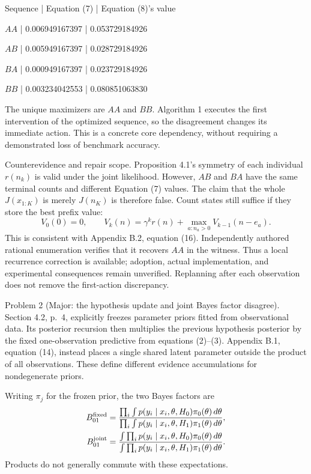 \documentclass[10pt]{article}
\begin{document}
Sequence | Equation (7) | Equation (8)’s value\par
\(AA\) | 0.006949167397 | 0.053729184926\par
\(AB\) | 0.005949167397 | 0.028729184926\par
\(BA\) | 0.000949167397 | 0.023729184926\par
\(BB\) | 0.003234042553 | 0.080851063830\par
The unique maximizers are \(AA\) and \(BB\). Algorithm 1 executes the first intervention of the optimized sequence, so the disagreement changes its immediate action. This is a concrete core dependency, without requiring a demonstrated loss of benchmark accuracy.\par
Counterevidence and repair scope. Proposition 4.1’s symmetry of each individual \(r(n_k)\) is valid under the joint likelihood. However, \(AB\) and \(BA\) have the same terminal counts and different Equation (7) values. The claim that the whole \(J(x_{1:K})\) is merely \(J(n_K)\) is therefore false. Count states still suffice if they store the best prefix value: \[V_0(0)=0,\qquad
 V_k(n)=\gamma^k r(n)+\max_{a:n_a>0}V_{k-1}(n-e_a).\] This is consistent with Appendix B.2, equation (16). Independently authored rational enumeration verifies that it recovers \(AA\) in the witness. Thus a local recurrence correction is available; adoption, actual implementation, and experimental consequences remain unverified. Replanning after each observation does not remove the first-action discrepancy.\par
Problem 2 (Major: the hypothesis update and joint Bayes factor disagree).  Section 4.2, p. 4, explicitly freezes parameter priors fitted from observational data. Its posterior recursion then multiplies the previous hypothesis posterior by the fixed one-observation predictive from equations (2)–(3). Appendix B.1, equation (14), instead places a single shared latent parameter outside the product of all observations. These define different evidence accumulations for nondegenerate priors.\par
Writing \(\pi_j\) for the frozen prior, the two Bayes factors are \[\begin{aligned}
 B^{\rm fixed}_{01}
 &=\frac{\prod_i\int p(y_i\mid x_i,\theta,H_0)\pi_0(\theta)\,d\theta}
         {\prod_i\int p(y_i\mid x_i,\theta,H_1)\pi_1(\theta)\,d\theta},\\
 B^{\rm joint}_{01}
 &=\frac{\int\prod_i p(y_i\mid x_i,\theta,H_0)\pi_0(\theta)\,d\theta}
         {\int\prod_i p(y_i\mid x_i,\theta,H_1)\pi_1(\theta)\,d\theta}.\end{aligned}\] Products do not generally commute with these expectations.\par
\end{document}
